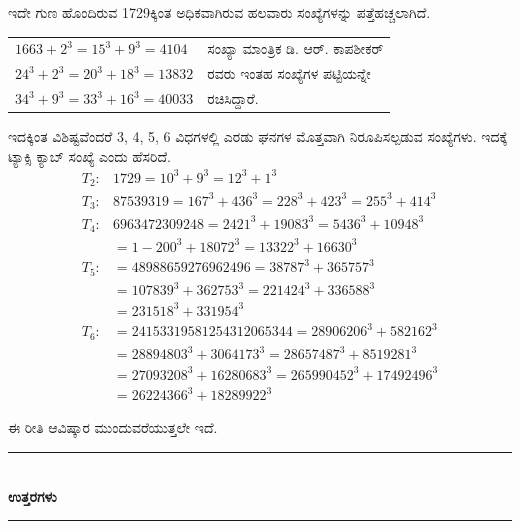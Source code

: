 \begin{enumerate}
ಇದೇ ಗುಣ ಹೊಂದಿರುವ 1729ಕ್ಕಿಂತ ಅಧಿಕವಾಗಿರುವ ಹಲವಾರು ಸಂಖ್ಯೆಗಳನ್ನು ಪತ್ತೆಹಚ್ಚಲಾಗಿದೆ. 

\begin{tabular}[t]{ll}
$166{3} + 2^{3} = 15^{3} + 9^{3} = 4104$ & ಸಂಖ್ಯಾ ಮಾಂತ್ರಿಕ ಡಿ. ಆರ್. ಕಾಪಶೀಕರ್\\
$24^{3} + 2^{3} = 20^{3} + 18^{3} = 13832$& ರವರು ಇಂತಹ ಸಂಖ್ಯೆಗಳ ಪಟ್ಟಿಯನ್ನೇ\\
$34^{3} + 9^{3} = 33^{3} + 16^{3} = 40033$ & ರಚಿಸಿದ್ದಾರೆ. 
\end{tabular}

ಇದಕ್ಕಿಂತ ವಿಶಿಷ್ಟವೆಂದರೆ 3, 4, 5, 6 ವಿಧಗಳಲ್ಲಿ ಎರಡು ಘನಗಳ ಮೊತ್ತವಾಗಿ ನಿರೂಪಿಸಲ್ಪಡುವ ಸಂಖ್ಯೆಗಳು. ಇದಕ್ಕೆ ಟ್ಯಾಕ್ಸಿ ಕ್ಯಾಬ್ ಸಂಖ್ಯೆ ಎಂದು ಹೆಸರಿದೆ.
\begin{align*}
T_{2} : & 1729 = 10^{3} + 9^{3} = 12^{3} + 1^{3}\\
T_{3} : & 87539319 = 167^{3} + 436^{3} = 228^{3} + 423^{3} = 255^{3} + 414^{3}\\
T_{4} : & 6963472309248 = 2421^{3} + 19083^{3} = 5436^{3} + 10948^{3}\\
& = 1-200^{3} + 18072^{3} = 13322^{3} + 16630^{3}\\
T_{5} : & = 48988659276962496 = 38787^{3} + 365757^{3}\\ 
& = 107839^{3} + 362753^{3} = 221424^{3} + 336588^{3}\\
& = 231518^{3} + 331954^{3}\\
T_{6} : & = 24153319581254312065344= 28906206^{3} + 582162^{3}\\
& = 28894803^{3} + 3064173^{3} = 28657487^{3} + 8519281^{3}\\
& = 27093208^{3} + 16280683^{3} = 265990452^{3} + 17492496^{3}\\
& = 26224366^{3} + 18289922^{3}
\end{align*}

ಈ ರೀತಿ ಆವಿಷ್ಕಾರ ಮುಂದುವರೆಯುತ್ತಲೇ ಇದೆ. 
\end{enumerate}

\smallskip

\begin{center}
\rule{5cm}{1pt}\\[3pt]
{\Large\bfseries ಉತ್ತರಗಳು}\\[-0.1cm]
\rule{5cm}{1pt}
\end{center}

